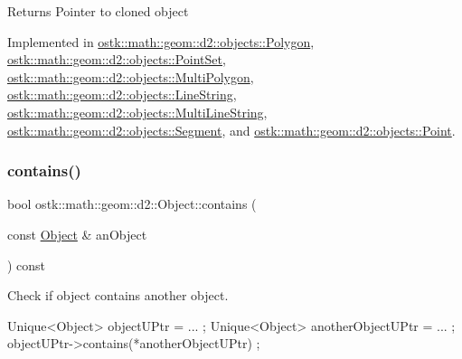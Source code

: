 \begin{DoxyReturn}{Returns}
Pointer to cloned object 
\end{DoxyReturn}


Implemented in \hyperlink{classostk_1_1math_1_1geom_1_1d2_1_1objects_1_1_polygon_a55e4524d1f58bf8379580e63f49f0b48}{ostk\+::math\+::geom\+::d2\+::objects\+::\+Polygon}, \hyperlink{classostk_1_1math_1_1geom_1_1d2_1_1objects_1_1_point_set_ac1d1c3727df0f10f527aa3d3551c8f4e}{ostk\+::math\+::geom\+::d2\+::objects\+::\+Point\+Set}, \hyperlink{classostk_1_1math_1_1geom_1_1d2_1_1objects_1_1_multi_polygon_a89fdf23e9f496c2e5f598c0dc8981c86}{ostk\+::math\+::geom\+::d2\+::objects\+::\+Multi\+Polygon}, \hyperlink{classostk_1_1math_1_1geom_1_1d2_1_1objects_1_1_line_string_abb5ac5e7e3e068c6597aab554e6a5e21}{ostk\+::math\+::geom\+::d2\+::objects\+::\+Line\+String}, \hyperlink{classostk_1_1math_1_1geom_1_1d2_1_1objects_1_1_multi_line_string_abf1b39f7e7f9c1f1ba9b040669863e81}{ostk\+::math\+::geom\+::d2\+::objects\+::\+Multi\+Line\+String}, \hyperlink{classostk_1_1math_1_1geom_1_1d2_1_1objects_1_1_segment_ad0ba7ee144638335e4f02da0de38beab}{ostk\+::math\+::geom\+::d2\+::objects\+::\+Segment}, and \hyperlink{classostk_1_1math_1_1geom_1_1d2_1_1objects_1_1_point_a8550e9fe2c23c1f38e53093f4480598d}{ostk\+::math\+::geom\+::d2\+::objects\+::\+Point}.

\mbox{\label{classostk_1_1math_1_1geom_1_1d2_1_1_object_ad932da22ca5827ee461b822fffd413c1}} 
\subsubsection{\texorpdfstring{contains()}{contains()}}
{\footnotesize\ttfamily bool ostk\+::math\+::geom\+::d2\+::\+Object\+::contains (\begin{DoxyParamCaption}\item[{const \hyperlink{classostk_1_1math_1_1geom_1_1d2_1_1_object}{Object} \&}]{an\+Object }\end{DoxyParamCaption}) const\hspace{0.3cm}{\ttfamily [virtual]}}



Check if object contains another object. 


\begin{DoxyCode}
Unique<Object> objectUPtr = ... ;
Unique<Object> anotherObjectUPtr = ... ;
objectUPtr->contains(*anotherObjectUPtr) ;
\end{DoxyCode}



